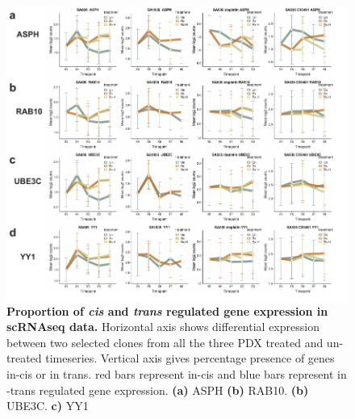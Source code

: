 \begin{figure}
\centering
  \includegraphics[width=\textwidth]{Figures/commongenesfromvolcanoplots.pdf}
	
\caption[Proportion of \textit{in-cis} and \textit{in-trans} regulated gene expression in scRNAseq data]
	{\small
	\textbf{Proportion of \textit{cis} and \textit{trans} regulated gene expression in scRNAseq data.}
	   Horizontal axis shows differential expression between two selected clones from all the three PDX treated and un-treated timeseries. Vertical axis gives percentage presence of genes in-cis or in trans. red bars represent in-cis and blue bars represent in -trans regulated gene expression.
	   \textbf{(a)} ASPH
	    \textbf{(b)} RAB10.
	    \textbf{(b)} UBE3C.
	     \textbf{c)} YY1
	}
	\label{fig:commongenesfromvolcanoplots}
\end{figure}





